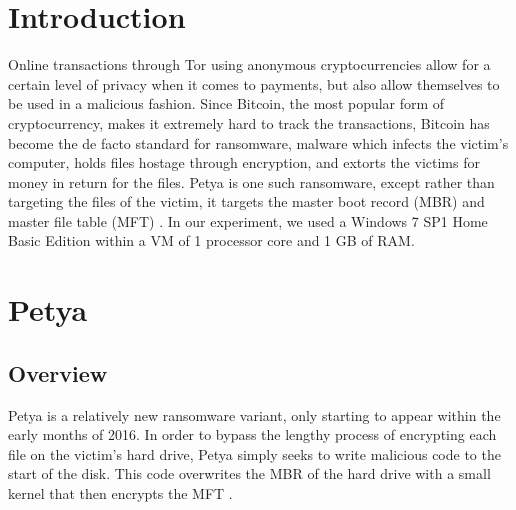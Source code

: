 \documentclass[twocolumn]{article}
\begin{document}

\section{Introduction}
\label{sec:introduction}
Online transactions through Tor \cite{tor} using anonymous cryptocurrencies allow for a certain level of privacy when it comes to payments, but also allow themselves to be used in a malicious fashion. Since Bitcoin, the most popular form of cryptocurrency, makes it extremely hard to track the transactions, Bitcoin has become the de facto standard for ransomware, malware which infects the victim's computer, holds files hostage through encryption, and extorts the victims for money in return for the files. Petya is one such ransomware, except rather than targeting the files of the victim, it targets the master boot record (MBR) and master file table (MFT) \cite{decryptPetya}. In our experiment, we used a Windows 7 SP1 Home Basic Edition within a VM of 1 processor core and 1 GB of RAM. 

\section{Petya}
\label{sec:petya}
\subsection{Overview}
Petya is a relatively new ransomware variant, only starting to appear within the early months of 2016. In order to bypass the lengthy process of encrypting each file on the victim's hard drive, Petya simply seeks to write malicious code to the start of the disk. This code overwrites the MBR of the hard drive with a small kernel that then encrypts the MFT \cite{lowLevelPetya}. 
\end{document}
